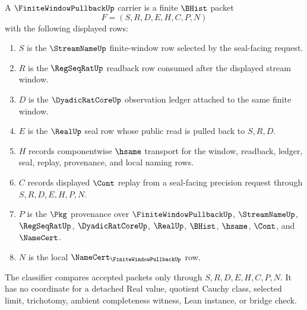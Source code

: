 \begin{definition}
\label{def:finite-window-pullback-carrier}
A $\FiniteWindowPullbackUp$ carrier is a finite $\BHist$ packet
$$
F=(S,R,D,E,H,C,P,N)
$$
with the following displayed rows:
\begin{enumerate}
\item $S$ is the $\StreamNameUp$ finite-window row selected by the seal-facing request.
\item $R$ is the $\RegSeqRatUp$ readback row consumed after the displayed stream window.
\item $D$ is the $\DyadicRatCoreUp$ observation ledger attached to the same finite window.
\item $E$ is the $\RealUp$ seal row whose public read is pulled back to $S,R,D$.
\item $H$ records componentwise $\hsame$ transport for the window, readback, ledger, seal, replay, provenance, and local naming rows.
\item $C$ records displayed $\Cont$ replay from a seal-facing precision request through $S,R,D,E,H,P,N$.
\item $P$ is the $\Pkg$ provenance over $\FiniteWindowPullbackUp$, $\StreamNameUp$, $\RegSeqRatUp$, $\DyadicRatCoreUp$, $\RealUp$, $\BHist$, $\hsame$, $\Cont$, and $\NameCert$.
\item $N$ is the local $\NameCert_{\FiniteWindowPullbackUp}$ row.
\end{enumerate}
The classifier compares accepted packets only through $S,R,D,E,H,C,P,N$. It has no coordinate for a detached Real value, quotient Cauchy class, selected limit, trichotomy, ambient completeness witness, Lean instance, or bridge check.
\end{definition}

